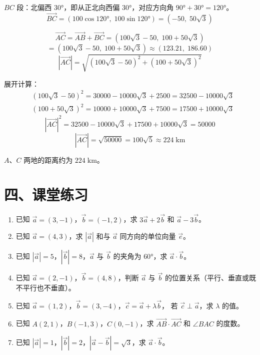\documentclass[12pt, a4paper]{ctexart}
\begin{document}
$BC$ 段：北偏西 $30°$，即从正北向西偏 $30°$，对应方向角 $90°+30°=120°$。
\[
\overrightarrow{BC} = (100\cos 120°,\; 100\sin 120°) = (-50,\; 50\sqrt{3})
\]

\[
\overrightarrow{AC} = \overrightarrow{AB} + \overrightarrow{BC}
= (100\sqrt{3}-50,\; 100+50\sqrt{3})
\]
\[
= (100\sqrt{3}-50,\; 100+50\sqrt{3})
\approx (123.21,\; 186.60)
\]
\[
|\overrightarrow{AC}| = \sqrt{(100\sqrt{3}-50)^2 + (100+50\sqrt{3})^2}
\]

展开计算：
\begin{align*}
&(100\sqrt{3}-50)^2 = 30000 - 10000\sqrt{3} + 2500 = 32500 - 10000\sqrt{3} \\
&(100+50\sqrt{3})^2 = 10000 + 10000\sqrt{3} + 7500 = 17500 + 10000\sqrt{3}
\end{align*}
\[
|\overrightarrow{AC}|^2 = 32500 - 10000\sqrt{3} + 17500 + 10000\sqrt{3} = 50000
\]
\[
|\overrightarrow{AC}| = \sqrt{50000} = 100\sqrt{5} \approx 224\;\text{km}
\]

$A$、$C$ 两地的距离约为 $224\;\text{km}$。

\vspace{10pt}

\section*{\textcolor{tipgreen}{四、课堂练习}}

\begin{enumerate}[label=\textbf{\arabic*.}, leftmargin=2em]
  \item 已知 $\vec{a}=(3,-1)$，$\vec{b}=(-1,2)$，求 $3\vec{a}+2\vec{b}$ 和 $\vec{a}-3\vec{b}$。

  \item 已知 $\vec{a}=(4,3)$，求 $|\vec{a}|$ 和与 $\vec{a}$ 同方向的单位向量 $\vec{e}$。

  \item 已知 $|\vec{a}|=5$，$|\vec{b}|=8$，$\vec{a}$ 与 $\vec{b}$ 的夹角为 $60°$，求 $\vec{a}\cdot\vec{b}$。

  \item 已知 $\vec{a}=(2,-1)$，$\vec{b}=(4,8)$，判断 $\vec{a}$ 与 $\vec{b}$ 的位置关系（平行、垂直或既不平行也不垂直）。

  \item 已知 $\vec{a}=(1,2)$，$\vec{b}=(3,-4)$，$\vec{c}=\vec{a}+\lambda\vec{b}$，
        若 $\vec{c} \perp \vec{a}$，求 $\lambda$ 的值。

  \item 已知 $A(2,1)$，$B(-1,3)$，$C(0,-1)$，求 $\overrightarrow{AB}\cdot\overrightarrow{AC}$ 和 $\angle BAC$ 的度数。

  \item 已知 $|\vec{a}|=1$，$|\vec{b}|=2$，$|\vec{a}-\vec{b}|=\sqrt{3}$，求 $\vec{a}\cdot\vec{b}$。
\end{enumerate}
\end{document}
